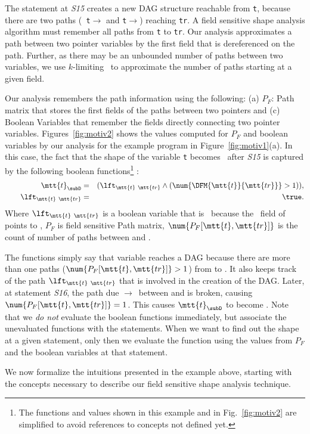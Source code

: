 \begin{example}{\rm 
The  statement at  {\em S15}  creates a  new DAG structure
reachable  from {\tt t},  because there  are two  paths ({\tt
  t$\rightarrow$\lft} and  {\tt t$\rightarrow$\rht}) reaching
{\tt tr}.   A field  sensitive shape analysis  algorithm must
remember all  paths from {\tt  t} to {\tt tr}.   Our analysis
approximates  a path  between  two pointer  variables by  the
first  field that is  dereferenced on  the path.  Further, as
there  may  be  an  unbounded  number of  paths  between  two
variables, we  use $k$-limiting~\cite{Jones79} to approximate
the number of paths starting at a given field.

Our  analysis  remembers   the  path  information  using  the
following:  (a)  $P_F$: Path  matrix  that  stores the  first
fields  of the  paths between  two pointers  and  (c) Boolean
Variables  that remember the  fields directly  connecting two
pointer   variables.  Figures~\ref{fig:motiv2} shows  the
values computed  for $P_F$ and boolean variables by our
analysis for the  example program in Figure~\ref{fig:motiv1}(a). In
this case,  the fact that the  shape of the  variable {\tt t}
becomes \Dag\ after {\em S15}  is captured by  the following
boolean functions\footnote{The functions  and values shown in
  this example and in Fig.~\ref{fig:motiv2} are simplified
  to avoid references to concepts not defined yet.}  :
\begin{eqnarray*} 
  \mtt{t}_{\subD} &=& ({\lft}_{\mtt{t}\ \mtt{tr}} \wedge (\num{\DFM{\mtt{t}}{\mtt{tr}}} > 1)), \\ 
  \qquad {\lft}_{\mtt{t}\ \mtt{tr}} &=& \true. 
\end{eqnarray*}
Where ${\lft}_{\mtt{t}\ \mtt{tr}}$ is a boolean variable that
is \true\ because  the \lft\ field of  points to , 
$P_F$  is field sensitive  Path matrix, $\num{P_F[\mtt{t},\mtt{tr}]}$ 
  is the  count of number of paths between  and .

The  functions simply  say that  variable   reaches a
DAG because  there are more than  one paths ($\num{P_F[\mtt
      {t},\mtt{tr}]} >  1$) from  to . It also
keeps  track  of the  path  ${\lft}_{\mtt{t}\  \mtt{tr}}$ that  is
involved in  the creation of  the DAG.  Later,  at statement
{\em S16}, the path due $\rightarrow$\rht\ between  
and   is broken,  causing $\num{P_F[\mtt{t},\mtt{
      tr}]} =  1$.  This  causes $\mtt{t}_{\subD}$  to become
\false.  Note  that  we  {\em  do not}  evaluate  the  boolean
functions   immediately,   but   associate  the   unevaluated
functions with the  statements. When we want to  find out the
shape  at  a  given  statement,  only then  we  evaluate  the
function  using  the  values   from  $P_F$  and  the  boolean
variables at that statement.
\hfill\psframebox{}}
\end{example}

We  now formalize  the  intuitions presented  in the  example
above, starting  with the concepts necessary  to describe our
field sensitive shape analysis technique.
